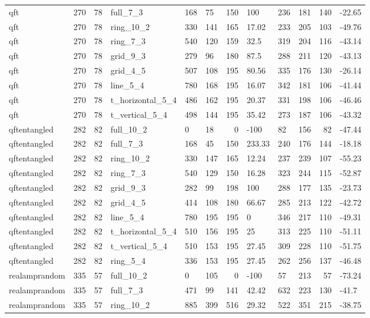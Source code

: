 \begin{longtable}{lrrlllrlllrl}
qft & 270 & 78 & full\_7\_3 & 168 & 75 & 150 & 100 & 236 & 181 & 140 & -22.65 \\
qft & 270 & 78 & ring\_10\_2 & 330 & 141 & 165 & 17.02 & 233 & 205 & 103 & -49.76 \\
qft & 270 & 78 & ring\_7\_3 & 540 & 120 & 159 & 32.5 & 319 & 204 & 116 & -43.14 \\
qft & 270 & 78 & grid\_9\_3 & 279 & 96 & 180 & 87.5 & 288 & 211 & 120 & -43.13 \\
qft & 270 & 78 & grid\_4\_5 & 507 & 108 & 195 & 80.56 & 335 & 176 & 130 & -26.14 \\
qft & 270 & 78 & line\_5\_4 & 780 & 168 & 195 & 16.07 & 342 & 181 & 106 & -41.44 \\
qft & 270 & 78 & t\_horizontal\_5\_4 & 486 & 162 & 195 & 20.37 & 331 & 198 & 106 & -46.46 \\
qft & 270 & 78 & t\_vertical\_5\_4 & 498 & 144 & 195 & 35.42 & 273 & 187 & 106 & -43.32 \\
qftentangled & 282 & 82 & full\_10\_2 & 0 & 18 & 0 & -100 & 82 & 156 & 82 & -47.44 \\
qftentangled & 282 & 82 & full\_7\_3 & 168 & 45 & 150 & 233.33 & 240 & 176 & 144 & -18.18 \\
qftentangled & 282 & 82 & ring\_10\_2 & 330 & 147 & 165 & 12.24 & 237 & 239 & 107 & -55.23 \\
qftentangled & 282 & 82 & ring\_7\_3 & 540 & 129 & 150 & 16.28 & 323 & 244 & 115 & -52.87 \\
qftentangled & 282 & 82 & grid\_9\_3 & 282 & 99 & 198 & 100 & 288 & 177 & 135 & -23.73 \\
qftentangled & 282 & 82 & grid\_4\_5 & 414 & 108 & 180 & 66.67 & 285 & 213 & 122 & -42.72 \\
qftentangled & 282 & 82 & line\_5\_4 & 780 & 195 & 195 & 0 & 346 & 217 & 110 & -49.31 \\
qftentangled & 282 & 82 & t\_horizontal\_5\_4 & 510 & 156 & 195 & 25 & 313 & 225 & 110 & -51.11 \\
qftentangled & 282 & 82 & t\_vertical\_5\_4 & 510 & 153 & 195 & 27.45 & 309 & 228 & 110 & -51.75 \\
qftentangled & 282 & 82 & ring\_5\_4 & 336 & 153 & 195 & 27.45 & 262 & 256 & 137 & -46.48 \\
realamprandom & 335 & 57 & full\_10\_2 & 0 & 105 & 0 & -100 & 57 & 213 & 57 & -73.24 \\
realamprandom & 335 & 57 & full\_7\_3 & 471 & 99 & 141 & 42.42 & 632 & 223 & 130 & -41.7 \\
realamprandom & 335 & 57 & ring\_10\_2 & 885 & 399 & 516 & 29.32 & 522 & 351 & 215 & -38.75 \\

\end{longtable}
